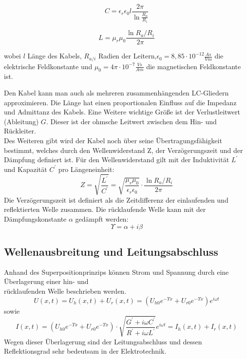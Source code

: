 \documentclass{article}
\begin{document}
    \begin{equation}
        C= \epsilon_r \epsilon_0 l \frac{2\pi}{\ln{\frac{R_a}{R_i}}}
    \end{equation}
    
    \begin{equation}
        L= \mu_r \mu_0  \frac{\ln{R_a/R_i}}{2\pi}
    \end{equation}
    
wobei $l$ Länge des Kabels, $R_{a/i}$ Radien der Leitern,$\epsilon_0 = 8,85\cdot10^{-12} \frac{As}{Vm}$ die elektrische Feldkonstante und $\mu_0 = 4\pi\cdot 10^{-7} \frac{Vs}{Am}$ die magnetischen Feldkonstante ist.

Den Kabel kann man auch als mehreren zusammenhängenden LC-Gliedern approximieren. Die Länge hat einen proportionalen Einfluss auf die Impedanz und Admittanz des Kabels. Eine Weitere wichtige Größe ist der Verlustleitwert (Ableitung) $G$. Dieser ist der ohmsche Leitwert zwischen dem Hin- und Rückleiter. \\
Des Weiteren gibt wird der Kabel noch über seine Übertragungsfähigkeit bestimmt, welches durch den Wellenwiderstand Z, der Verzögerungszeit und der Dämpfung definiert ist. Für den Wellenwiderstand gilt mit der Induktivität $L^{\prime}$ und Kapazität $C^{\prime}$ pro Längeneinheit:
\[ Z = \sqrt{\frac{L^{\prime}}{C^{\prime}}}= \sqrt{\frac{\mu_r \mu_0}{\epsilon_r \epsilon_0}}\cdot \frac{\ln{R_a/R_i}}{2\pi}\]
Die Verzögerungszeit ist definiert als die Zeitdifferenz der einlaufenden und reflektierten Welle zusammen. 
Die rücklaufende Welle kann mit der Dämpfungskonstante $ \alpha$ gedämpft werden:
\begin{equation*}
    \Upsilon = \alpha + i \beta
\end{equation*}


\subsection*{Wellenausbreitung und Leitungsabschluss}
Anhand des Superpositionprinzips können Strom und Spannung durch eine Überlagerung einer hin- und \\ rücklaufenden Welle beschrieben werden.
\begin{equation*}
   U(x,t) = U_h(x,t) + U_r(x,t)= (U_{h0} e ^{-\Upsilon x} + U_{r0} e ^{-\Upsilon x}) e^{i \omega t} 
\end{equation*}
sowie
\begin{equation*}
    I(x,t) = (U_{h0} e^{-\Upsilon x} + U_{r0} e^{-\Upsilon x}) \cdot \sqrt{\frac{G^{\prime}+ i \omega C^{\prime}}{R^{\prime}+ i \omega L^{\prime}}}e^{i \omega t}= I_h(x,t) + I_r(x,t)
\end{equation*}
Wegen dieser Überlagerung sind der Leitungsabschluss und dessen Reflektionsgrad  sehr bedeutsam in der Elektrotechnik.
\end{document}
